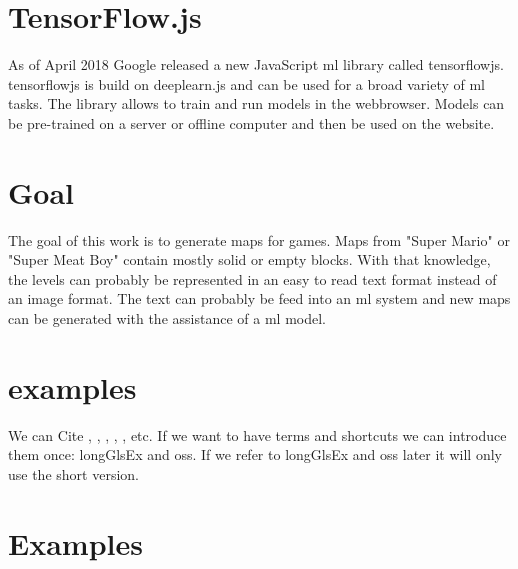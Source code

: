 \documentclass[10pt]{article}
\begin{document}
\section{TensorFlow.js}
As of April 2018 Google released a new JavaScript \gls{ml} library called \gls{tensorflowjs}. \gls{tensorflowjs} is build on deeplearn.js and can be used for a broad variety of \gls{ml} tasks. The library allows to train and run models in the webbrowser. Models can be pre-trained on a server or offline computer and then be used on the website.

\section{Goal}
The goal of this work is to generate maps for games. Maps from "Super Mario" or "Super Meat Boy" contain mostly solid or empty blocks. With that knowledge, the levels can probably be represented in an easy to read text format instead of an image format. The text can probably be feed into an \gls{ml} system and new maps can be generated with the assistance of a \gls{ml} model.

\section{examples}

We can Cite \cite{wikipediaScriptingLanguage}, \cite{Iivari2008usabilityInCompanyOSS}, \cite{almarzouq2005open}, \cite{heiseonline2017limuxservus}, \cite{viorres2007major}, \cite{wikipediaScriptingLanguage} etc. If we want to have terms and shortcuts we can introduce them once: \gls{longGlsEx} and \gls{oss}. If we refer to \gls{longGlsEx} and \gls{oss} later it will only use the short version.

\newpage
\newpage

\section{Examples}
\end{document}
